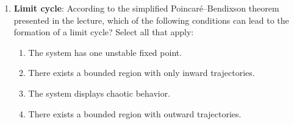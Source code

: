 \documentclass[11pt,letterpaper]{article}
\begin{document}
\begin{enumerate}
    \item \textbf{Limit cycle}: According to the simplified Poincaré–Bendixson theorem presented in the lecture, which of the following conditions can lead to the formation of a limit cycle? Select all that apply:
    \begin{enumerate}
        \item The system has one unstable fixed point.
        \item There exists a bounded region with only inward trajectories.
        \item The system displays chaotic behavior.
        \item There exists a bounded region with outward trajectories.
    \end{enumerate}

\end{enumerate}
\pagebreak
\end{document}
